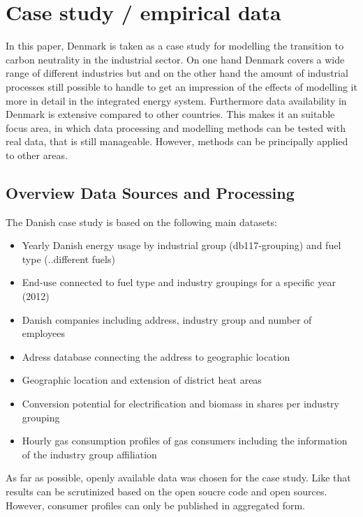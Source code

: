 \documentclass[review]{elsarticle}
\begin{document}
\section{Case study / empirical data} \label{datadescr}


In this paper, Denmark is taken as a case study for modelling the transition to carbon neutrality in the industrial sector. On one hand Denmark covers a wide range of different industries but  and on the other hand the amount of industrial processes still possible to handle to get an impression of the effects of modelling it more in detail in the integrated energy system. Furthermore data availability in Denmark is extensive compared to other countries. This makes it an suitable focus area, in which data processing and modelling methods can be tested with real data, that is still manageable. However, methods can be principally applied to other areas.

\subsection{Overview Data Sources and Processing}
The Danish case study is based on the following main datasets:
\begin{itemize}
 \item Yearly Danish energy usage by industrial group (db117-grouping) and fuel type (..different fuels)
 \item End-use connected to fuel type and industry groupings for a specific year (2012) 
 \item Danish companies including address, industry group and number of employees
 \item Adress database connecting the address to geographic location
 \item Geographic location and extension of district heat areas
 \item Conversion potential for electrification and biomass in shares per industry grouping
 \item Hourly gas consumption profiles of gas consumers including the information of the industry group affiliation
\end{itemize}

As far as possible, openly available data was chosen for the case study. Like that results can be scrutinized based on the open soucre code and open sources. However, consumer profiles can only be published in aggregated form.
\end{document}
